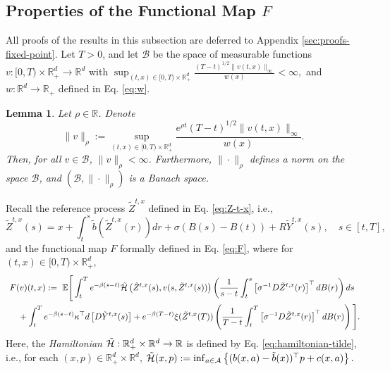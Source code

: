 \documentclass[11pt]{article}
\theoremstyle{definition}
\theoremstyle{plain}
\newtheorem{lemma}[assumption]{Lemma}
\newcommand{\R}{\mathbb{R}}
\newcommand{\cH}{{\cal H}}
\newcommand{\tb}{\tilde{b}}
\begin{document}
\subsection{Properties of the Functional Map \texorpdfstring{$F$}{F}}\label{sec:fixed-point}
All proofs of the results in this subsection are deferred to Appendix \ref{sec:proofs-fixed-point}.
Let \( T > 0 \), and let \( \mathcal{B} \) be the space of measurable functions 
\( v : [0, T) \times \mathbb{R}^d_+ \to \mathbb{R}^d \) with
\(
\sup_{(t,x) \in [0,T) \times \mathbb{R}^d_+} \frac{(T - t)^{1/2} \|v(t,x)\|_\infty}{w(x)} < \infty,
\)
and \( w : \R^d \to \R_+ \) defined in Eq. \eqref{eq:w}.

\begin{lemma}\label{lem:norm-rho-banach}
Let \( \rho \in \mathbb{R} \). Denote
\begin{equation}\label{eq:norm-rho}
\|v\|_\rho := \sup_{(t,x) \in [0,T) \times \mathbb{R}^d_+} \frac{e^{\rho t}(T - t)^{1/2} \|v(t,x)\|_\infty}{w(x)}.
\end{equation}
Then, for all \( v \in \mathcal{B} \), \( \|v\|_\rho < \infty \). 
Furthermore, \( \|\cdot\|_\rho \) defines a norm on the space \( \mathcal{B}\), and \( (\mathcal{B}, \|\cdot\|_\rho) \) is a Banach space.
\end{lemma}

Recall the reference process \( \tilde{Z}^{t,x} \) defined in Eq. \eqref{eq:Z-t-x}, i.e., 
\begin{equation*}
  \tilde{Z}^{t,x}(s) = x + \int_t^s \tb(\tilde{Z}^{t,x}(r)) dr + \sigma (B(s) - B(t)) + R \tilde{Y}^{t,x}(s), \quad s \in [t,T],
  \end{equation*}
and the functional map $F$ formally defined in Eq. \eqref{eq:F}, where
for \( (t,x) \in [0,T) \times \mathbb{R}^d_+ \),
\begin{align*}
&~F(v)(t,x) :=~\mathbb{E} \Bigg[ \int_t^T e^{-\beta(s-t)} \tilde \cH \left( \tilde{Z}^{t,x}(s), v(s, \tilde{Z}^{t,x}(s))\right) \left(\frac{1}{s - t} \int_t^s \left[\sigma^{-1} D \tilde{Z}^{t,x}(r)\right]^{\top} dB(r)\right) ds \nonumber \\
& ~~~~ + \int_t^T e^{-\beta(s-t)} \kappa^{\top} d\left[D\tilde Y^{t,x}(s)\right] + e^{-\beta(T-t)}\xi(\tilde{Z}^{t,x}(T)) \left( \frac{1}{T - t} \int_t^T \left[\sigma^{-1} D \tilde{Z}^{t,x}(r)\right]^{\top} dB(r) \right) \Bigg].
\end{align*}
Here, the {\em Hamiltonian} \( \tilde \cH : \R_+^d \times \R^d \to \R \) is defined by Eq. \eqref{eq:hamiltonian-tilde}, i.e., 
for each \( (x,p) \in \mathbb{R}^d_+ \times \mathbb{R}^d \),
\(
\tilde \cH(x,p) := \inf_{a \in \mathcal{A}} \left\{ (b(x,a) - \tb(x))^{\top} p + c(x,a) \right\}.
\)
\end{document}

